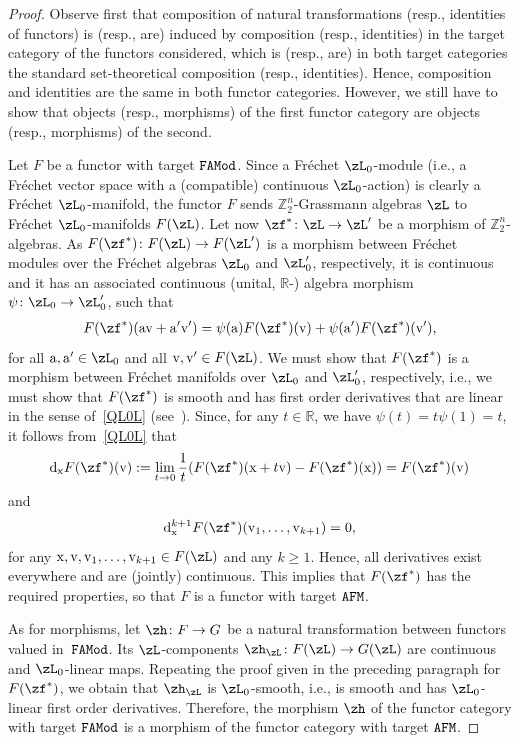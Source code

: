 \documentclass[10pt,a4paper]{amsart}
\newcommand{\R}{{\mathbb R}}
\newcommand{\Z}{{\mathbb Z}}
\newcommand{\0}{\otimes}
\newcommand{\z}{\Z_2^n}
\numberwithin{equation}{section}
\begin{document}
\begin{proof}
Observe first that composition of natural transformations (resp., identities of functors) is (resp., are) induced by composition (resp., identities) in the target category of the functors considered, which is (resp., are) in both target categories the standard set-theoretical composition (resp., identities). Hence, composition and identities are the same in both functor categories. However, we still have to show that objects (resp., morphisms) of the first functor category are objects (resp., morphisms) of the second.

Let $F$ be a functor with target $\tt FAMod$. Since a Fr\'echet $\zL_0$-module (i.e., a Fr\'echet vector space with a (compatible) continuous $\zL_0$-action) is clearly a Fr\'echet $\zL_0$-manifold, the functor $F$ sends $\z$-Grassmann algebras $\zL$ to Fr\'echet $\zL_0$-manifolds $F(\zL)$. Let now $\zf^*\colon \zL\to \zL'$ be a morphism of $\z$-algebras. As $F(\zf^*)\colon F(\zL)\to F(\zL')$ is a morphism between Fr\'echet modules over the Fr\'echet algebras $\zL_0$ and $\zL'_0$, respectively, it is continuous and it has an associated continuous (unital, $\R$-) algebra morphism $\psi\colon \zL_0\to\zL'_0$, such that
\begin{gather}\label{QL0L}
F(\zf^*)({\rm a}{\rm v}+{\rm a}'{\rm v}')=\psi({\rm a})F(\zf^*)({\rm v})+\psi({\rm a}')F(\zf^*)({\rm v}'),
\end{gather}
for all ${\rm a,a'}\in\zL_0$ and all ${\rm v,v'}\in F(\zL)$. We must show that $F(\zf^*)$ is a morphism between Fr\'echet manifolds over $\zL_0$ and $\zL'_0$, respectively, i.e., we must show that $F(\zf^*)$ is smooth and has first order derivatives that are linear in the sense of~\eqref{QL0L} (see~\cite{Bruce:2019b}). Since, for any $t\in\R$, we have $\psi(t)=t\psi(1)=t$, it follows from~\eqref{QL0L} that
\[
{\rm d}_{\rm x}F(\zf^*)({\rm v}):=\lim_{t\to 0}\frac{1}{t}(F(\zf^*)({\rm x}+t{\rm v})-F(\zf^*)({\rm x}))=F(\zf^*)({\rm v})
\]
and
\[
{\rm d}^{k+1}_{\rm x}F(\zf^*)({\rm v}_1,\dots,{\rm v}_{k+1})=0,
\]
for any ${\rm x}, {\rm v}, {\rm v}_1,\dots, {\rm v}_{k+1}\in F(\zL)$ and any $k\ge 1$. Hence, all derivatives exist everywhere and are (jointly) continuous. This implies that $F(\zf^*)$ has the required properties, so that $F$ is a functor with target $\tt AFM$.

As for morphisms, let $\zh\colon F\to G$ be a natural transformation between functors valued in~$\tt FAMod$. Its $\zL$-components $\zh_\zL\colon F(\zL)\to G(\zL)$ are continuous and $\zL_0$-linear maps. Repeating the proof given in the preceding paragraph for $F(\zf^*)$, we obtain that $\zh_\zL$ is $\zL_0$-smooth, i.e., is smooth and has $\zL_0$-linear first order derivatives. Therefore, the morphism $\zh$ of the functor category with target $\tt FAMod$ is a morphism of the functor category with target $\tt AFM$.
\end{proof}
\end{document}
